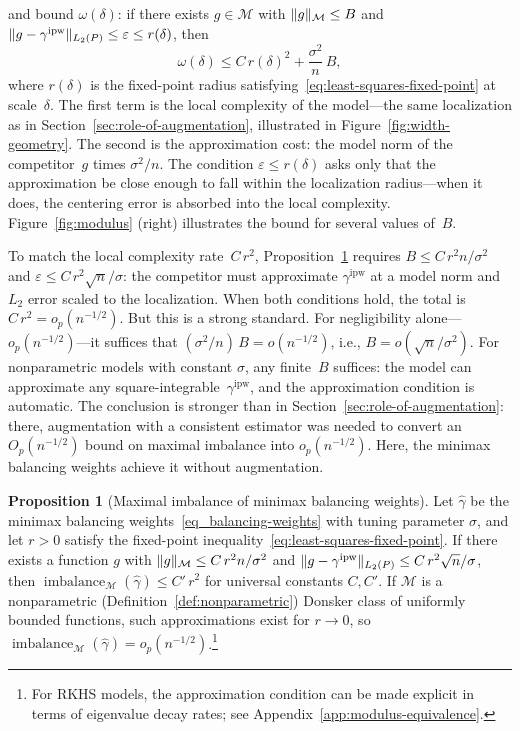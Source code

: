 \documentclass{article}
\DeclarePairedDelimiter\norm{\lVert}{\rVert}
\theoremstyle{definition}
\newtheorem{proposition}[theorem]{Proposition}
\newcommand{\ipw}{\text{ipw}}
\DeclareMathOperator{\imbalance}{imbalance}
\newcommand{\hgamma}{\ensuremath{\hat\gamma}}
\newcommand{\gammaipw}{\ensuremath{\gamma^{\ipw}}}
\newcommand{\model}{\mathcal{M}}
\newcommand{\<}{\langle}
\renewcommand{\>}{\rangle}
\begin{document}
\citet{kong2025asymptotics} and \citet{hirshberg2026bregman} bound $\omega(\delta)$: if there exists $g \in \model$ with $\norm{g}_\model \le B$ and $\norm{g - \gammaipw}_{L_2(P)} \le \varepsilon \le r(\delta)$, then
\begin{equation}
\label{eq:omega-bound}
\omega(\delta) \le C\,r(\delta)^2 + \frac{\sigma^2}{n}\,B,
\end{equation}
where $r(\delta)$ is the fixed-point radius satisfying~\eqref{eq:least-squares-fixed-point} at scale~$\delta$. The first term is the local complexity of the model---the same localization as in Section~\ref{sec:role-of-augmentation}, illustrated in Figure~\ref{fig:width-geometry}. The second is the approximation cost: the model norm of the competitor~$g$ times $\sigma^2/n$. The condition $\varepsilon \le r(\delta)$ asks only that the approximation be close enough to fall within the localization radius---when it does, the centering error is absorbed into the local complexity. Figure~\ref{fig:modulus} (right) illustrates the bound for several values of~$B$.

To match the local complexity rate~$C\,r^2$, Proposition~\ref{prop:bias-balance} requires $B \le C\,r^2 n/\sigma^2$ and $\varepsilon \le C\,r^2\sqrt{n}/\sigma$: the competitor must approximate $\gammaipw$ at a model norm and $L_2$ error scaled to the localization. When both conditions hold, the total is $C\,r^2 = o_p(n^{-1/2})$. But this is a strong standard. For negligibility alone---$o_p(n^{-1/2})$---it suffices that $(\sigma^2/n)\,B = o(n^{-1/2})$, i.e., $B = o(\sqrt{n}/\sigma^2)$. For nonparametric models with constant $\sigma$, any finite~$B$ suffices: the model can approximate any square-integrable~$\gammaipw$, and the approximation condition is automatic. The conclusion is stronger than in Section~\ref{sec:role-of-augmentation}: there, augmentation with a consistent estimator was needed to convert an $O_p(n^{-1/2})$ bound on maximal imbalance into $o_p(n^{-1/2})$. Here, the minimax balancing weights achieve it without augmentation.

\begin{proposition}[Maximal imbalance of minimax balancing weights]
\label{prop:bias-balance}
Let $\hgamma$ be the minimax balancing weights~\eqref{eq_balancing-weights} with tuning parameter $\sigma$,
and let $r > 0$ satisfy the fixed-point inequality~\eqref{eq:least-squares-fixed-point}. If there exists a function $g$ with $\norm{g}_\model \le C\, r^2 n / \sigma^2$ and $\norm{g - \gammaipw}_{L_2(P)} \le C\, r^2 \sqrt{n}/\sigma$, then $\imbalance_\model(\hgamma) \le C'\, r^2$ for universal constants $C, C'$. If $\model$ is a nonparametric (Definition~\ref{def:nonparametric}) Donsker class of uniformly bounded functions, such approximations exist for $r \to 0$, so $\imbalance_\model(\hgamma) = o_p(n^{-1/2})$.\footnote{For RKHS models, the approximation condition can be made explicit in terms of eigenvalue decay rates; see Appendix~\ref{app:modulus-equivalence}.}
\end{proposition}
\end{document}
